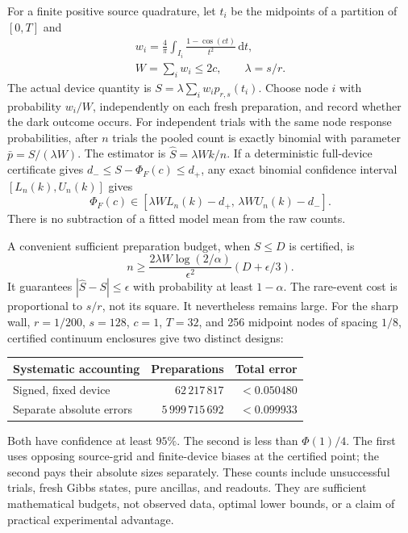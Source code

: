 \documentclass[aps,pra,reprint,superscriptaddress,longbibliography]{revtex4-2}
\newcommand{\dd}{\mathrm d}
\begin{document}
For a finite positive source quadrature, let $t_i$ be the midpoints
of a partition of $[0,T]$ and
\begin{equation}
 \begin{gathered}
 w_i=\frac4\pi\int_{I_i}\frac{1-\cos(ct)}{t^2}\,\dd t,
 \qquad\\ W=\sum_iw_i\le2c,\qquad \lambda=s/r.                 \label{eq:weights}
 \end{gathered}
\end{equation}
The actual device quantity is $S=\lambda\sum_iw_ip_{r,s}(t_i)$.
Choose node $i$ with probability $w_i/W$, independently on each
fresh preparation, and record whether the dark outcome occurs.
For independent trials with the same node response probabilities,
after $n$ trials the pooled count is exactly binomial with parameter
$\bar p=S/(\lambda W)$. The estimator is
$\widehat S=\lambda W k/n$. If a deterministic full-device
certificate gives $d_-\le S-\Phi_F(c)\le d_+$, any exact binomial
confidence interval $[L_n(k),U_n(k)]$ gives
\begin{equation}
 \Phi_F(c)\in[\lambda W L_n(k)-d_+,\,
              \lambda W U_n(k)-d_-].                         \label{eq:confidence}
\end{equation}
There is no subtraction of a fitted model mean from the raw counts.

A convenient sufficient preparation budget, when $S\le D$ is
certified, is
\begin{equation}
 n\ge\frac{2\lambda W\log(2/\alpha)}{\epsilon^2}
                      (D+\epsilon/3).                        \label{eq:shots}
\end{equation}
It guarantees $|\widehat S-S|\le\epsilon$ with probability at least
$1-\alpha$. The rare-event cost is proportional to $s/r$, not its
square. It nevertheless remains large. For the sharp wall,
$r=1/200$, $s=128$, $c=1$, $T=32$, and 256 midpoint nodes of spacing
$1/8$, certified continuum enclosures give two distinct designs:
\begin{center}
\begin{tabular}{lrr}
\toprule
Systematic accounting & Preparations & Total error\\
\midrule
Signed, fixed device & $62\,217\,817$ & $<0.050480$\\
Separate absolute errors & $5\,999\,715\,692$ & $<0.099933$\\
\bottomrule
\end{tabular}
\end{center}
Both have confidence at least $95\%$. The second is less than
$\Phi(1)/4$. The first uses opposing source-grid and finite-device
biases at the certified point; the second pays their absolute sizes
separately. These counts include unsuccessful trials, fresh Gibbs
states, pure ancillas, and readouts. They are sufficient mathematical
budgets, not observed data, optimal lower bounds, or a claim of
practical experimental advantage.
\end{document}
